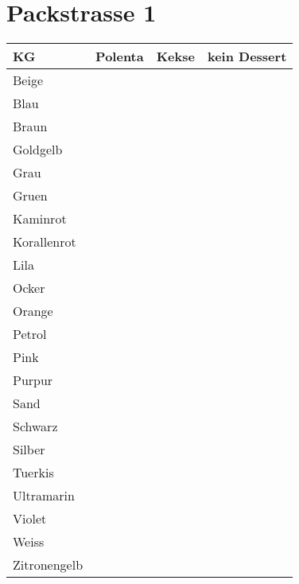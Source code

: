 \documentclass[14pt]{article}
\begin{document}
\fontsize{15}{18} \selectfont
\centering

\newpage
\section{Packstrasse 1}
\begin{tabular}{l|l|l|l}
  \toprule
  KG  &Polenta&Kekse&kein Dessert\\
  \midrule

Beige&&&\\

Blau&&&\\


Braun&&&\\


Goldgelb&&&\\


Grau&&&\\


Gruen&&&\\


Kaminrot&&&\\


Korallenrot&&&\\


Lila&&&\\


Ocker&&&\\


Orange&&&\\


Petrol&&&\\


Pink&&&\\


Purpur&&&\\


Sand&&&\\


Schwarz&&&\\


Silber&&&\\


Tuerkis&&&\\


Ultramarin&&&\\


Violet&&&\\


Weiss&&&\\


  Zitronengelb&&&\\
  \bottomrule
\end{tabular}
  \newpage
  
\end{document}
